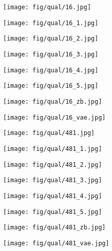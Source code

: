 \documentclass[10pt,twocolumn,letterpaper]{article}
\newcommand{\sz}{0.102}
\newcommand{\szl}{0.067}
\begin{document}
\begin{figure*}[t]
\begin{subfigure}[c]{\sz\linewidth}
\texttt{[image: fig/qual/16.jpg]}
\end{subfigure}
\begin{subfigure}[c]{\sz\linewidth}
\texttt{[image: fig/qual/16\_1.jpg]}
\end{subfigure}
\begin{subfigure}[c]{\sz\linewidth}
\texttt{[image: fig/qual/16\_2.jpg]}
\end{subfigure}
\begin{subfigure}[c]{\sz\linewidth}
\texttt{[image: fig/qual/16\_3.jpg]}
\end{subfigure}
\begin{subfigure}[c]{\sz\linewidth}
\texttt{[image: fig/qual/16\_4.jpg]}
\end{subfigure}
\hspace{3pt}
\begin{subfigure}[c]{\sz\linewidth}
\texttt{[image: fig/qual/16\_5.jpg]}
\end{subfigure}
\begin{subfigure}[c]{\szl\linewidth}
\texttt{[image: fig/qual/16\_zb.jpg]}
\end{subfigure}
\hspace{3pt}
\begin{subfigure}[c]{\szl\linewidth}
\texttt{[image: fig/qual/16\_vae.jpg]}
\end{subfigure}

\begin{subfigure}[c]{\sz\linewidth}
\texttt{[image: fig/qual/481.jpg]}
\end{subfigure}
\begin{subfigure}[c]{\sz\linewidth}
\texttt{[image: fig/qual/481\_1.jpg]}
\end{subfigure}
\begin{subfigure}[c]{\sz\linewidth}
\texttt{[image: fig/qual/481\_2.jpg]}
\end{subfigure}
\begin{subfigure}[c]{\sz\linewidth}
\texttt{[image: fig/qual/481\_3.jpg]}
\end{subfigure}
\begin{subfigure}[c]{\sz\linewidth}
\texttt{[image: fig/qual/481\_4.jpg]}
\end{subfigure}
\hspace{3pt}
\begin{subfigure}[c]{\sz\linewidth}
\texttt{[image: fig/qual/481\_5.jpg]}
\end{subfigure}
\begin{subfigure}[c]{\szl\linewidth}
\texttt{[image: fig/qual/481\_zb.jpg]}
\end{subfigure}
\hspace{3pt}
\begin{subfigure}[c]{\szl\linewidth}
\texttt{[image: fig/qual/481\_vae.jpg]}
\end{subfigure}


\end{figure*}
\end{document}
